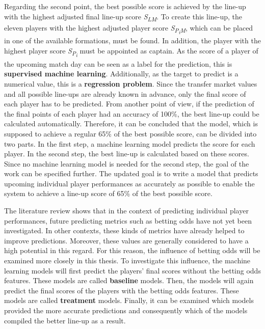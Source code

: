 Regarding the second point, the best possible score is achieved by the line-up with the highest adjusted final line-up score \emph{S\textsubscript{LM}}. To create this line-up, the eleven players with the highest adjusted player score \emph{S\textsubscript{P\textsubscript{i}M}}, which can be placed in one of the available formations, must be found. In addition, the player with the highest player score \emph{S\textsubscript{P\textsubscript{i}}} must be appointed as captain. As the score of a player of the upcoming match day can be seen as a label for the prediction, this is \textbf{supervised machine learning}. Additionally, as the target to predict is a numerical value, this is a \textbf{regression problem}. Since the transfer market values and all possible line-ups are already known in advance, only the final score of each player has to be predicted. From another point of view, if the prediction of the final points of each player had an accuracy of 100\%, the best line-up could be calculated automatically. Therefore, it can be concluded that the model, which is supposed to achieve a regular 65\% of the best possible score, can be divided into two parts. In the first step, a machine learning model predicts the score for each player. In the second step, the best line-up is calculated based on these scores. Since no machine learning model is needed for the second step, the goal of the work can be specified further. The updated goal is to write a model that predicts upcoming individual player performances as accurately as possible to enable the system to achieve a line-up score of 65\% of the best possible score.

The literature review shows that in the context of predicting individual player performances, future predicting metrics such as betting odds have not yet been investigated. In other contexts, these kinds of metrics have already helped to improve predictions. \parencite[cf.][]{landers_machine_2017} Moreover, these values are generally considered to have a high potential in this regard. \parencite[cf.][]{wheatcroft_profiting_2020,goldstein_wisdom_2014} For this reason, the influence of betting odds will be examined more closely in this thesis. To investigate this influence, the machine learning models will first predict the players' final scores without the betting odds features. These models are called \textbf{baseline} models. Then, the models will again predict the final scores of the players with the betting odds features. These models are called \textbf{treatment} models. Finally, it can be examined which models provided the more accurate predictions and consequently which of the models compiled the better line-up as a result.

